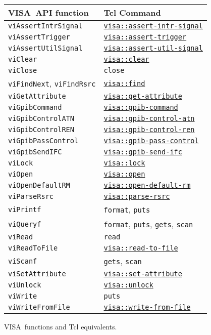 \documentclass[12pt, a4paper]{report}
\newcommand{\VISA}{\mbox{VISA }}
\newcommand{\COMMANDREF}[1]{{\tt \hyperref[#1]{#1}}}
\newcommand{\VISACOMMANDREF}[1]{{\tt \mbox{#1}}\index{#1}}
\newcommand{\TCLCOMMANDREF}[1]{{\tt \mbox{#1}}\index{#1}}
\begin{document}
\begin{figure}
\caption{\VISA functions and Tcl equivalents.}
\label{tabCorrespondence}
\medskip
\begin{tabular}{ll}
\VISA API function & Tcl Command \\
\hline
\VISACOMMANDREF{viAssertIntrSignal} & \COMMANDREF{visa::assert-intr-signal}	\\
\VISACOMMANDREF{viAssertTrigger} & \COMMANDREF{visa::assert-trigger}	\\
\VISACOMMANDREF{viAssertUtilSignal} & \COMMANDREF{visa::assert-util-signal}	\\
\VISACOMMANDREF{viClear} & \COMMANDREF{visa::clear}	\\
\VISACOMMANDREF{viClose} & \TCLCOMMANDREF{close}	\\
\VISACOMMANDREF{viFindNext}, \VISACOMMANDREF{viFindRsrc} & \COMMANDREF{visa::find}	\\
\VISACOMMANDREF{viGetAttribute} & \COMMANDREF{visa::get-attribute}	\\
\VISACOMMANDREF{viGpibCommand} & \COMMANDREF{visa::gpib-command}	\\
\VISACOMMANDREF{viGpibControlATN} & \COMMANDREF{visa::gpib-control-atn}	\\
\VISACOMMANDREF{viGpibControlREN} & \COMMANDREF{visa::gpib-control-ren}	\\
\VISACOMMANDREF{viGpibPassControl} & \COMMANDREF{visa::gpib-pass-control}	\\
\VISACOMMANDREF{viGpibSendIFC} & \COMMANDREF{visa::gpib-send-ifc}	\\
\VISACOMMANDREF{viLock} & \COMMANDREF{visa::lock}	\\
\VISACOMMANDREF{viOpen} & \COMMANDREF{visa::open}	\\
\VISACOMMANDREF{viOpenDefaultRM} & \COMMANDREF{visa::open-default-rm}	\\
\VISACOMMANDREF{viParseRsrc} & \COMMANDREF{visa::parse-rsrc}	\\
\VISACOMMANDREF{viPrintf} & \TCLCOMMANDREF{format}, \TCLCOMMANDREF{puts}	\\
\VISACOMMANDREF{viQueryf} & \TCLCOMMANDREF{format}, \TCLCOMMANDREF{puts}, \TCLCOMMANDREF{gets}, \TCLCOMMANDREF{scan}	\\
\VISACOMMANDREF{viRead} & \TCLCOMMANDREF{read}	\\
\VISACOMMANDREF{viReadToFile} & \COMMANDREF{visa::read-to-file}	\\
\VISACOMMANDREF{viScanf} & \TCLCOMMANDREF{gets}, \TCLCOMMANDREF{scan}	\\
\VISACOMMANDREF{viSetAttribute} & \COMMANDREF{visa::set-attribute}	\\
\VISACOMMANDREF{viUnlock} & \COMMANDREF{visa::unlock}	\\
\VISACOMMANDREF{viWrite} & \TCLCOMMANDREF{puts}	\\
\VISACOMMANDREF{viWriteFromFile} & \COMMANDREF{visa::write-from-file}	\\
\end{tabular}
\end{figure}
\end{document}
